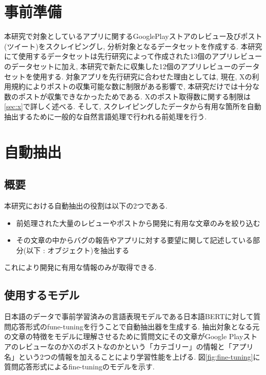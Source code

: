 \section{事前準備}
本研究で対象としているアプリに関するGooglePlayストアのレビュー及びポスト(ツイート)をスクレイピングし, 分析対象となるデータセットを作成する. 本研究にて使用するデータセットは先行研究によって作成された13個のアプリレビューのデータセットに加え, 本研究で新たに収集した12個のアプリレビューのデータセットを使用する. 
対象アプリを先行研究に合わせた理由としては, 現在, Xの利用規約によりポストの収集可能な数に制限がある影響で, 本研究だけでは十分な数のポストが収集できなかったためである. Xのポスト取得数に関する制限は\ref{sec:x}で詳しく述べる. 
そして, スクレイピングしたデータから有用な箇所を自動抽出するために一般的な自然言語処理で行われる前処理を行う. 


\section{自動抽出}
\subsection{概要}
本研究における自動抽出の役割は以下の2つである. 
\begin{itemize}
  \item 前処理された大量のレビューやポストから開発に有用な文章のみを絞り込む
  \item その文章の中からバグの報告やアプリに対する要望に関して記述している部分(以下 : オブジェクト)を抽出する
\end{itemize}
これにより開発に有用な情報のみが取得できる. 

\subsection{使用するモデル}
日本語のデータで事前学習済みの言語表現モデルである日本語BERTに対して質問応答形式のfune-tuningを行うことで自動抽出器を生成する. 
抽出対象となる元の文章の特徴をモデルに理解させるために質問文にその文章がGoogle PlayストアのレビューなのかXのポストなのかという「カテゴリー」の情報と「アプリ名」という2つの情報を加えることにより学習性能を上げる. 
図\ref{fig:fine-tuning}に質問応答形式によるfine-tuningのモデルを示す. 

